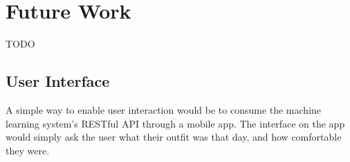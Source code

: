 \section{Future Work}
\label{section:futurework}
TODO

\subsection{User Interface}
A simple way to enable user interaction would be to consume the machine learning system's RESTful API through a
mobile app. The interface on the app would simply ask the user what their outfit was that day, and how comfortable
they were.
